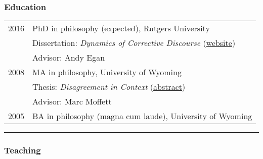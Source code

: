 \documentclass[10pt]{article}
\begin{document}
\subsubsection*{Education}

\begin{tabular}{ll}
  2016 & PhD in philosophy (expected), Rutgers University \\
  & \hspace{10pt} Dissertation: \textit{Dynamics of Corrective Discourse} (\href{http://conjecture.pancakeapps.com/}{website}) \\
  & \hspace{10pt} Advisor: Andy Egan \\[5pt]
  2008 & MA in philosophy, University of Wyoming \\
  & \hspace{10pt} Thesis: \textit{Disagreement in Context} (\href{http://www.erikhoversten.org/research/disagreement-context-abstract.pdf}{abstract}) \\
  & \hspace{10pt} Advisor: Marc Moffett \\[5pt]
  2005 & BA in philosophy (magna cum laude), University of Wyoming \\
\end{tabular}
\vspace{10pt}
\hrule

\subsubsection*{Teaching}
\end{document}
